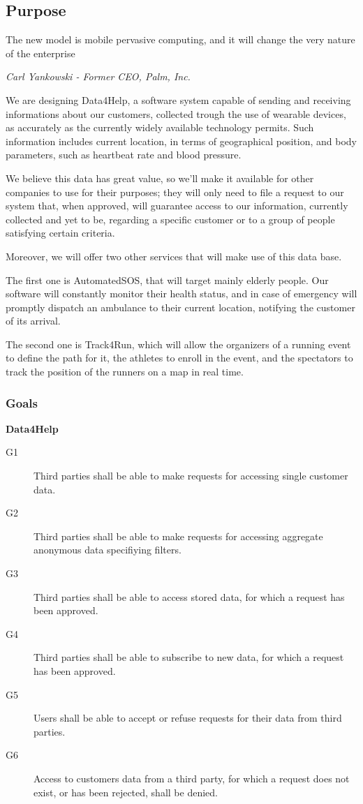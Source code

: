 \documentclass[../main.tex]{subfiles}
\begin{document}
\subsection{Purpose}

\epigraph{The new model is mobile pervasive computing, and it will change the very nature of the enterprise}{\textit{Carl Yankowski - Former CEO, Palm, Inc.}}
We are designing Data4Help, a software system capable of sending and receiving informations about our customers, collected trough the use of wearable devices, as accurately as the currently widely available technology permits.
Such information includes current location, in terms of geographical position, and body parameters, such as heartbeat rate and blood pressure.

We believe this data has great value, so we'll make it available for other companies to use for their purposes; they will only need to file a request to our system that, when approved, will guarantee access to our information, currently collected and yet to be, regarding a specific customer or to a group of people satisfying certain criteria.

Moreover, we will offer two other services that will make use of this data base.

The first one is AutomatedSOS, that will target mainly elderly people. Our software will constantly monitor their health status, and in case of emergency will promptly dispatch an ambulance to their current location, notifying the customer of its arrival.

The second one is Track4Run, which will allow the organizers of a running event to define the path for it, the athletes to enroll in the event, and the spectators to track the position of the runners on a map in real time.


\subsubsection{Goals}

\begin{minipage}{\textwidth}
{\bf Data4Help}
\begin{description}
	\item [G1]  Third parties shall be able to make requests for accessing single customer data.
	\item [G2]  Third parties shall be able to make requests for accessing aggregate anonymous data specifiying filters.
	\item [G3]  Third parties shall be able to access stored data, for which a request has been approved.
	\item [G4]  Third parties shall be able to subscribe to new data, for which a request has been approved.
	\item [G5]  Users shall be able to accept or refuse requests for their data from third parties.
	\item [G6]  Access to customers data from a third party, for which a request does not exist, or has been rejected, shall be denied.
\end{description}
\end{minipage}
\vspace{8mm}
\end{document}
